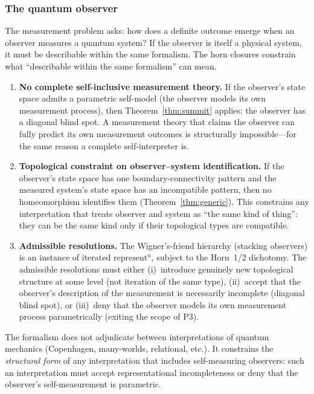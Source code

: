 \documentclass[11pt]{article}
\begin{document}
\subsubsection{The quantum observer}
\label{sec:admissible-qm}

The measurement problem asks: how does a definite outcome emerge when
an observer measures a quantum system?  If the observer is itself a
physical system, it must be describable within the same formalism.
The horn closures constrain what ``describable within the same
formalism'' can mean.

\begin{enumerate}[label=(\alph*),itemsep=0.3ex]
\item \textbf{No complete self-inclusive measurement theory.}
  If the observer's state space admits a parametric self-model
  (the observer models its own measurement process), then
  Theorem~\ref{thm:summit} applies: the observer has a diagonal
  blind spot.  A measurement theory that claims the observer can
  fully predict its own measurement outcomes is structurally
  impossible---for the same reason a complete self-interpreter is.
\item \textbf{Topological constraint on observer--system
  identification.}
  If the observer's state space has one boundary-connectivity pattern
  and the measured system's state space has an incompatible pattern,
  then no homeomorphism identifies them
  (Theorem~\ref{thm:generic}).  This constrains any interpretation
  that treats observer and system as ``the same kind of thing'':
  they can be the same kind only if their topological types are
  compatible.
\item \textbf{Admissible resolutions.}
  The Wigner's-friend hierarchy (stacking observers) is an instance
  of iterated $\mathrm{represent}^n$, subject to the Horn~1/2
  dichotomy.  The admissible resolutions must either
  (i)~introduce genuinely new topological structure at some level
  (not iteration of the same type),
  (ii)~accept that the observer's description of the measurement is
  necessarily incomplete (diagonal blind spot), or
  (iii)~deny that the observer models its own measurement process
  parametrically (exiting the scope of P3).
\end{enumerate}

\noindent
The formalism does not adjudicate between interpretations of quantum
mechanics (Copenhagen, many-worlds, relational, etc.).  It constrains
the \emph{structural form} of any interpretation that includes
self-measuring observers: such an interpretation must accept
representational incompleteness or deny that the observer's
self-measurement is parametric.
\end{document}
